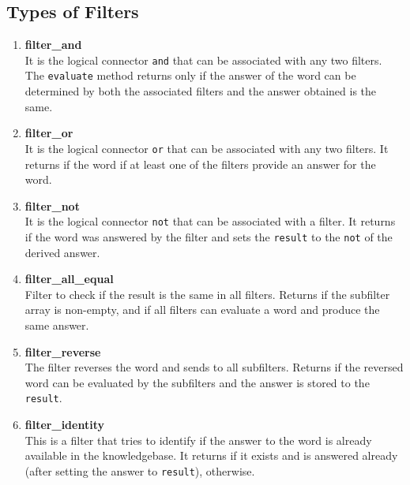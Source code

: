 \subsection{Types of Filters}
\begin{enumerate}
 
\item \textbf{filter\_and} \\
It is the logical connector \texttt{and} that can be associated with any two filters. The \texttt{evaluate} method returns \true only if the answer of the word can be determined by both the associated filters and the answer obtained is the same.

\item \textbf{filter\_or}  \\
It is the logical connector \texttt{or} that can be associated with any two filters. It returns \true if the word if at least one of the filters provide an answer for the word.

\item \textbf{filter\_not} \\
It is the logical connector \texttt{not} that can be associated with a filter. It returns \true if the word was answered by the filter and sets the \texttt{result} to the \texttt{not} of the derived answer.

\item \textbf{filter\_all\_equal} \\
Filter to check if the result is the same in all filters. Returns \true if the subfilter array is non-empty, and if all filters can evaluate a word and produce the same answer. 

\item \textbf{filter\_reverse} \\
The filter reverses the word and sends to all subfilters. Returns \true if the reversed word can be evaluated by the subfilters and the answer is stored to the \texttt{result}.

\item \textbf{filter\_identity} \\
This is a filter that tries to identify if the answer to the word is already available in the knowledgebase. It returns \true if it exists and is answered already (after setting the answer to \texttt{result}), \false otherwise.

\end{enumerate}

